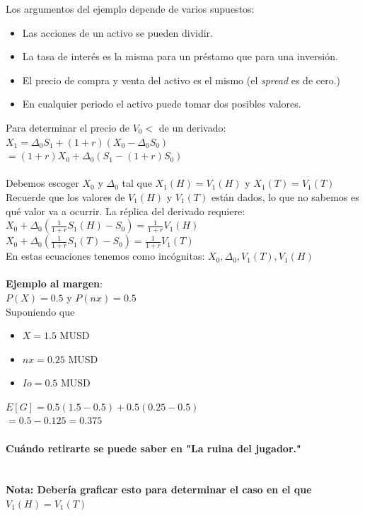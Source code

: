 \documentclass{article}
\begin{document}
        Los argumentos del ejemplo depende de varios supuestos:
        \begin{itemize}
            \item Las acciones de un activo se pueden dividir.
            \item La tasa de interés es la misma para un préstamo que para una inversión.
            \item El precio de compra y venta del activo es el mismo (el \textit{spread} es de cero.)
            \item En cualquier periodo el activo puede tomar dos posibles valores.
        \end{itemize}
        Para determinar el precio de \(V_0<\) de un derivado:
        \\
        \(X_1 = \Delta_0 S_1 + (1+r) (X_0 - \Delta_0 S_0)\)
        \\
        \(=(1+r) X_0 + \Delta_0 (S_1 - (1+r) S_0)\)
        \\
        \\
        Debemos escoger \(X_0\) y \(\Delta_0\) tal que \(X_1(H) = V_1(H)\) y \(X_1(T) = V_1(T)\)
        \\Recuerde que los valores de \(V_1(H)\) y \(V_1(T)\) están dados, lo que no sabemos es qué valor va a ocurrir. La réplica del derivado requiere:
        \\
        \(X_0 + \Delta_0 (\frac{1}{1+r}S_1(H)-S_0) = \frac{1}{1+r}V_1(H)\)
        \\
        \(X_0 + \Delta_0 (\frac{1}{1+r}S_1(T)-S_0) = \frac{1}{1+r}V_1(T)\)
        \\
        En estas ecuaciones tenemos como incógnitas: \(X_0, \Delta_0, V_1(T), V_1(H)\)
        \\
        \\
        \textbf{Ejemplo al margen}:
        \\
        \(P(X) = 0.5\) y \(P(nx) = 0.5\)
        \\
        Suponiendo que
        \begin{itemize}
            \item [] \(X = 1.5\) MUSD
            \item [] \(nx = 0.25\) MUSD
            \item [] \(Io = 0.5\) MUSD
        \end{itemize}
        \(E[G] = 0.5 (1.5-0.5) + 0.5(0.25-0.5)\)
        \\
        \(=0.5 -0.125 = 0.375\)
        \\
        \\
        \textbf{Cuándo retirarte se puede saber en "La ruina del jugador."}
        \\
        \\
        \\
        \textbf{Nota: Debería graficar esto para determinar el caso en el que }\(V_1(H) = V_1(T)\)
\end{document}
